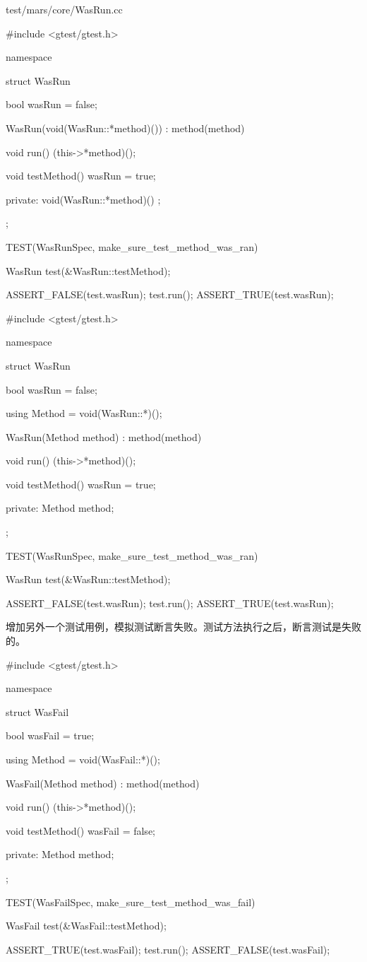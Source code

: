 \begin{diff}{test/mars/core/WasRun.cc}
\begin{minicpp}
#include <gtest/gtest.h>

namespace {
  struct WasRun {
    bool wasRun = false;

    WasRun(void(WasRun::*method)()) : method(method) {
    }

    void run() {
      (this->*method)();
    }

    void testMethod() {
      wasRun = true;
    }

  private:
    void(WasRun::*method)() ;
  };
}

TEST(WasRunSpec, make_sure_test_method_was_ran) {
  WasRun test(&WasRun::testMethod);

  ASSERT_FALSE(test.wasRun);
  test.run();
  ASSERT_TRUE(test.wasRun);
}
\end{minicpp}
\tcblower
\begin{minicpp}
#include <gtest/gtest.h>

namespace {
  struct WasRun {
    bool wasRun = false;

    using Method = void(WasRun::*)();

    WasRun(Method method) : method(method) {
    }

    void run() {
      (this->*method)();
    }

    void testMethod() {
      wasRun = true;
    }

  private:
    Method method;
  };
}

TEST(WasRunSpec, make_sure_test_method_was_ran) {
  WasRun test(&WasRun::testMethod);

  ASSERT_FALSE(test.wasRun);
  test.run();
  ASSERT_TRUE(test.wasRun);
}
\end{minicpp}
\end{diff}

增加另外一个测试用例，模拟测试断言失败。测试方法执行之后，断言测试是失败的。

\begin{nodiff}
\begin{c++}
#include <gtest/gtest.h>

namespace {
  struct WasFail {
    bool wasFail = true;

    using Method = void(WasFail::*)();

    WasFail(Method method) : method(method) {
    }

    void run() {
      (this->*method)();
    }

    void testMethod() {
      wasFail = false;
    }

  private:
    Method method;
  };
}

TEST(WasFailSpec, make_sure_test_method_was_fail) {
  WasFail test(&WasFail::testMethod);

  ASSERT_TRUE(test.wasFail);
  test.run();
  ASSERT_FALSE(test.wasFail);
}
\end{c++}
\end{nodiff}

